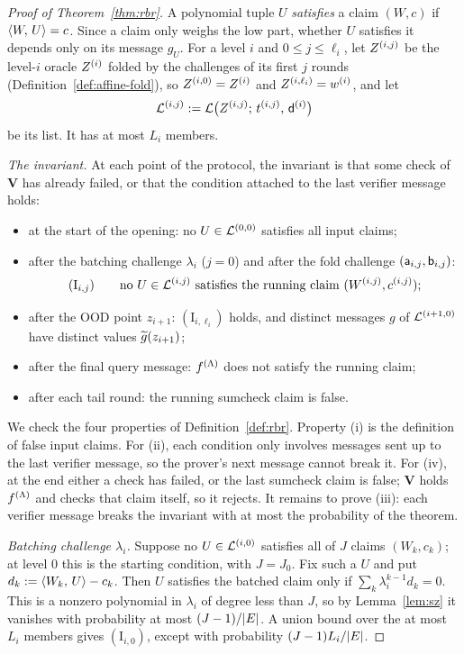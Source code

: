 \begin{proof}[Proof of Theorem~\ref{thm:rbr}]
A polynomial tuple $U$ \emph{satisfies} a claim $(W,c)$ if $\langle W,\, U \rangle=c$. Since a claim only weighs the low part, whether $U$ satisfies it depends only on its message $g_U$. For a level $i$ and $0\le j\le\ell_i$, let $Z^{(i,j)}$ be the level-$i$ oracle $Z^{(i)}$ folded by the challenges of its first $j$ rounds (Definition~\ref{def:affine-fold}), so $Z^{(i,0)}=Z^{(i)}$ and $Z^{(i,\ell_i)}=w^{(i)}$, and let
\[
\mathcal{L}^{(i,j)}:=\mathcal{L}\bigl(Z^{(i,j)};\,t^{(i,j)},\,\mathsf{d}^{(i)}\bigr)
\]
be its list. It has at most $L_i$ members.

\medskip\noindent\emph{The invariant.} At each point of the protocol, the invariant is that some check of $\mathbf{V}$ has already failed, or that the condition attached to the last verifier message holds:
\begin{itemize}[itemsep=1pt]
\item at the start of the opening: no $U\in\mathcal{L}^{(0,0)}$ satisfies all input claims;
\item after the batching challenge $\lambda_i$ ($j=0$) and after the fold challenge $(\mathsf{a}_{i,j},\mathsf{b}_{i,j})$:
\[
(\mathrm{I}_{i,j})\qquad\text{no } U\in\mathcal{L}^{(i,j)} \text{ satisfies the running claim } (W^{(i,j)},c^{(i,j)});
\]
\item after the OOD point $z_{i+1}$: $(\mathrm{I}_{i,\ell_i})$ holds, and distinct messages $g$ of $\mathcal{L}^{(i+1,0)}$ have distinct values $\widetilde{g}(z_{i+1})$;
\item after the final query message: $f^{(\Lambda)}$ does not satisfy the running claim;
\item after each tail round: the running sumcheck claim is false.
\end{itemize}
We check the four properties of Definition~\ref{def:rbr}. Property (i) is the definition of false input claims. For (ii), each condition only involves messages sent up to the last verifier message, so the prover's next message cannot break it. For (iv), at the end either a check has failed, or the last sumcheck claim is false; $\mathbf{V}$ holds $f^{(\Lambda)}$ and checks that claim itself, so it rejects. It remains to prove (iii): each verifier message breaks the invariant with at most the probability of the theorem.

\medskip\noindent\emph{Batching challenge $\lambda_i$.} Suppose no $U\in\mathcal{L}^{(i,0)}$ satisfies all of $J$ claims $(W_k,c_k)$; at level $0$ this is the starting condition, with $J=J_0$. Fix such a $U$ and put $d_k:=\langle W_k,\, U \rangle-c_k$. Then $U$ satisfies the batched claim only if $\sum_k\lambda_i^{k-1}d_k=0$. This is a nonzero polynomial in $\lambda_i$ of degree less than $J$, so by Lemma~\ref{lem:sz} it vanishes with probability at most $(J-1)/|E|$. A union bound over the at most $L_i$ members gives $(\mathrm{I}_{i,0})$, except with probability $(J-1)L_i/|E|$.


\end{proof}
